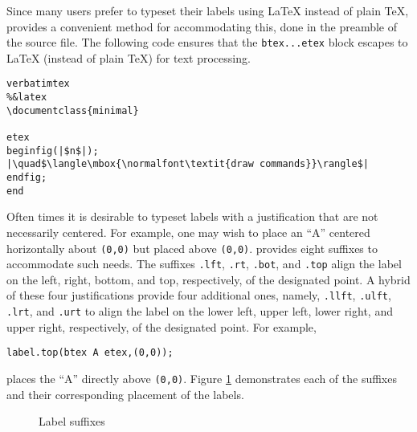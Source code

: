 Since many \MP{} users prefer to typeset their labels using \LaTeX{} instead of plain \TeX, \MP{} provides a convenient method for accommodating this, done in the preamble of the \MP{} source file.  The following code ensures that the \verb|btex...etex| block escapes to \LaTeX{} (instead of plain \TeX) for text processing.
\begin{lstlisting}[xleftmargin=56bp]
verbatimtex
%&latex
\documentclass{minimal}

etex
beginfig(|$n$|);
|\quad$\langle\mbox{\normalfont\textit{draw commands}}\rangle$|
endfig;
end
\end{lstlisting}

Often times it is desirable to typeset labels with a justification that are not necessarily centered.  For example, one may wish to place an ``A'' centered horizontally about \texttt{(0,0)} but placed above \texttt{(0,0)}. \MP{} provides eight suffixes to accommodate such needs.  The suffixes \texttt{.lft}, \texttt{.rt}, \texttt{.bot}, and \texttt{.top} align the label on the left, right, bottom, and top, respectively, of the designated point.  A hybrid of these four justifications provide four additional ones, namely, \texttt{.llft}, \texttt{.ulft}, \texttt{.lrt}, and \texttt{.urt} to align the label on the lower left, upper left, lower right, and upper right, respectively, of the designated point.  For example, \begin{center}\verb|label.top(btex A etex,(0,0));|\end{center} places the ``A'' directly above \texttt{(0,0)}.  Figure \ref{fig:label} demonstrates each of the suffixes and their corresponding placement of the labels.
\begin{figure}[hptb]
	\begin{center}\hfill{}\hfill{}\hfill\mbox{}\end{center}
	\caption{Label suffixes}\label{fig:label}
\end{figure}
